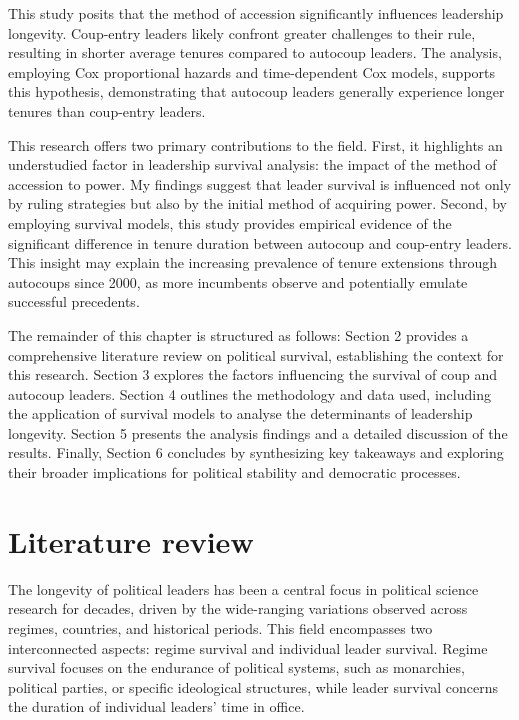 \documentclass[
  12pt,
]{report}
\begin{document}
This study posits that the method of accession significantly influences
leadership longevity. Coup-entry leaders likely confront greater
challenges to their rule, resulting in shorter average tenures compared
to autocoup leaders. The analysis, employing Cox proportional hazards
and time-dependent Cox models, supports this hypothesis, demonstrating
that autocoup leaders generally experience longer tenures than
coup-entry leaders.

This research offers two primary contributions to the field. First, it
highlights an understudied factor in leadership survival analysis: the
impact of the method of accession to power. My findings suggest that
leader survival is influenced not only by ruling strategies but also by
the initial method of acquiring power. Second, by employing survival
models, this study provides empirical evidence of the significant
difference in tenure duration between autocoup and coup-entry leaders.
This insight may explain the increasing prevalence of tenure extensions
through autocoups since 2000, as more incumbents observe and potentially
emulate successful precedents.

The remainder of this chapter is structured as follows: Section 2
provides a comprehensive literature review on political survival,
establishing the context for this research. Section 3 explores the
factors influencing the survival of coup and autocoup leaders. Section 4
outlines the methodology and data used, including the application of
survival models to analyse the determinants of leadership longevity.
Section 5 presents the analysis findings and a detailed discussion of
the results. Finally, Section 6 concludes by synthesizing key takeaways
and exploring their broader implications for political stability and
democratic processes.

\section{Literature review}\label{literature-review}

The longevity of political leaders has been a central focus in political
science research for decades, driven by the wide-ranging variations
observed across regimes, countries, and historical periods. This field
encompasses two interconnected aspects: regime survival and individual
leader survival. Regime survival focuses on the endurance of political
systems, such as monarchies, political parties, or specific ideological
structures, while leader survival concerns the duration of individual
leaders' time in office.
\end{document}
